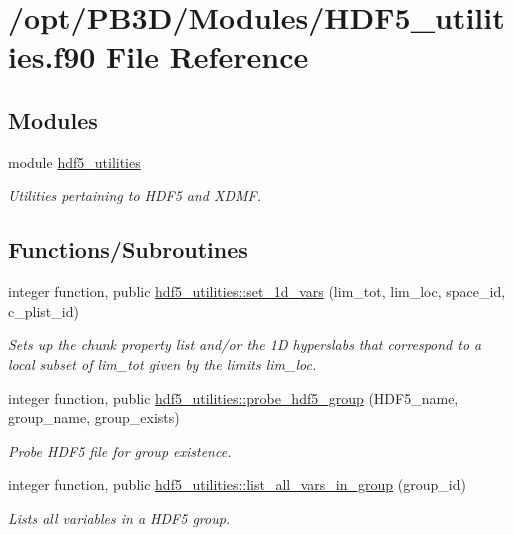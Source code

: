 \hypertarget{HDF5__utilities_8f90}{}\section{/opt/\+P\+B3\+D/\+Modules/\+H\+D\+F5\+\_\+utilities.f90 File Reference}
\label{HDF5__utilities_8f90}
\subsection*{Modules}
\begin{DoxyCompactItemize}
\item 
module \hyperlink{namespacehdf5__utilities}{hdf5\+\_\+utilities}
\begin{DoxyCompactList}\small\item\em Utilities pertaining to H\+D\+F5 and X\+D\+MF. \end{DoxyCompactList}\end{DoxyCompactItemize}
\subsection*{Functions/\+Subroutines}
\begin{DoxyCompactItemize}
\item 
integer function, public \hyperlink{namespacehdf5__utilities_a7574320980affc30a584f7776d33a51c}{hdf5\+\_\+utilities\+::set\+\_\+1d\+\_\+vars} (lim\+\_\+tot, lim\+\_\+loc, space\+\_\+id, c\+\_\+plist\+\_\+id)
\begin{DoxyCompactList}\small\item\em Sets up the chunk property list and/or the 1D hyperslabs that correspond to a local subset of {\ttfamily lim\+\_\+tot} given by the limits {\ttfamily lim\+\_\+loc}. \end{DoxyCompactList}\item 
integer function, public \hyperlink{namespacehdf5__utilities_ae4e6c96512460a0ede8dc5b1a43681e8}{hdf5\+\_\+utilities\+::probe\+\_\+hdf5\+\_\+group} (H\+D\+F5\+\_\+name, group\+\_\+name, group\+\_\+exists)
\begin{DoxyCompactList}\small\item\em Probe H\+D\+F5 file for group existence. \end{DoxyCompactList}\item 
integer function, public \hyperlink{namespacehdf5__utilities_aa9d76166f970a7052cd0d96c8f3ee0be}{hdf5\+\_\+utilities\+::list\+\_\+all\+\_\+vars\+\_\+in\+\_\+group} (group\+\_\+id)
\begin{DoxyCompactList}\small\item\em Lists all variables in a H\+D\+F5 group. \end{DoxyCompactList}\end{DoxyCompactItemize}
